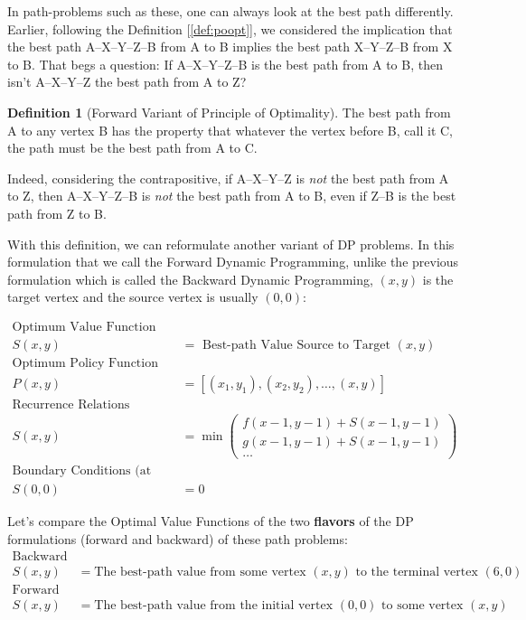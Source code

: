 \documentclass[english,notitlepage,smartquotes]{hgbreport}
\theoremstyle{definition}
\newtheorem{definition}{Definition}
\theoremstyle{definition}
\theoremstyle{remark}
\theoremstyle{definition}
\theoremstyle{plain}
\theoremstyle{definition}
\begin{document}
In path-problems such as these, one can always look at the best path differently. Earlier, following the Definition [\ref{def:poopt}], we considered the implication that the best path A--X--Y--Z--B from A to B implies the best path X--Y--Z--B from X to B. That begs a question: If A--X--Y--Z--B is the best path from A to B, then isn't A--X--Y--Z the best path from A to Z?
\begin{definition}[Forward Variant of Principle of Optimality]
\label{def:pooptforward}
The best path from A to any vertex B has the property that whatever the vertex before B, call it C, the path must be the best path from A to C.
\end{definition}
Indeed, considering the contrapositive, if A--X--Y--Z is \emph{not} the best path from A to Z, then A--X--Y--Z--B is \emph{not} the best path from A to B, even if Z--B is the best path from Z to B.

With this definition, we can reformulate another variant of DP problems. In this formulation that we call the Forward Dynamic Programming, unlike the previous formulation which is called the Backward Dynamic Programming, $(x,y)$ is the target vertex and the source vertex is usually $(0,0)$:

\begin{equation}
\begin{aligned}
\text{Optimum Value Function}\\ 
S(x,y)&=\text{ Best-path Value Source to Target $(x,y)$}\\
\text{Optimum Policy Function}\\
P(x,y)&=[(x_1,y_1),(x_2,y_2),\dots,(x,y)] \\
\text{Recurrence Relations}\\
S(x,y)&=
\min\begin{pmatrix}
f(x-1,y-1)+S(x-1,y-1)\\
g(x-1,y-1)+S(x-1,y-1)\\
\dots
\end{pmatrix}\\
\text{Boundary Conditions (at Source)}\\
S(0,0)&=0
\label{eq:fwddp1}
\end{aligned}
\end{equation}

Let's compare the Optimal Value Functions of the two \textbf{flavors} of the DP formulations (forward and backward) of these path problems:
\begin{equation}
\label{eq:comparesbf}
\begin{aligned}
\text{Backward}\\
S(x,y)&=\text{The best-path value from some vertex $(x,y)$ to the terminal vertex $(6,0)$}\\
\text{Forward}\\
S(x,y)&=\text{The best-path value from the initial vertex $(0,0)$ to some vertex $(x,y)$}
\end{aligned}
\end{equation}
\end{document}

